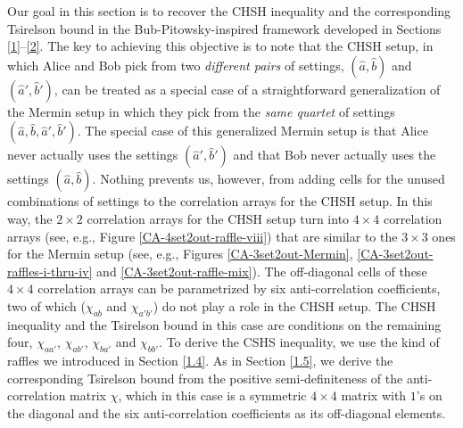 Our goal in this section is to recover the CHSH inequality and the corresponding Tsirelson bound  in the Bub-Pitowsky-inspired framework developed in Sections \ref{1}--\ref{2}. The key to achieving this objective is to note that the CHSH setup, in which Alice and Bob pick from two \emph{different pairs} of settings, $(\hat{a}, \hat{b})$ and $(\hat{a}', \hat{b}')$, can be treated as a special case of a straightforward generalization of the Mermin setup in which they pick from the \emph{ same quartet} of settings $(\hat{a}, \hat{b}, \hat{a}', \hat{b}')$. The special case of this generalized Mermin setup is that Alice never actually uses the settings $(\hat{a}', \hat{b}')$ and that Bob never actually uses the settings  $(\hat{a}, \hat{b})$. Nothing prevents us, however, from adding cells for the unused combinations of settings to the correlation arrays for the CHSH setup. In this way, the $2 \times 2$ correlation arrays for the CHSH setup turn into $4 \times 4$ correlation arrays (see, e.g., Figure \ref{CA-4set2out-raffle-viii}) that are similar to the $3 \times 3$ ones for the Mermin setup (see, e.g.,  Figures \ref{CA-3set2out-Mermin}, \ref{CA-3set2out-raffles-i-thru-iv} and \ref{CA-3set2out-raffle-mix}). The off-diagonal cells of these $4 \times 4$ correlation arrays can be parametrized by six anti-correlation coefficients, two of which ($\chi_{ab}$ and $\chi_{a'b'}$) do not play a role in the CHSH setup. The CHSH inequality and the Tsirelson bound in this case are conditions on the remaining four, $\chi_{aa'}$, $\chi_{ab'}$, $\chi_{ba'}$ and $\chi_{bb'}$. To derive the CSHS inequality, we use the kind of raffles we introduced in Section \ref{1.4}. As in Section \ref{1.5}, we derive the corresponding Tsirelson bound from the positive semi-definiteness of the anti-correlation matrix $\chi$, which in this case is a symmetric $4 \times 4$ matrix with $1$'s on the diagonal and the six anti-correlation coefficients as its off-diagonal elements. 


